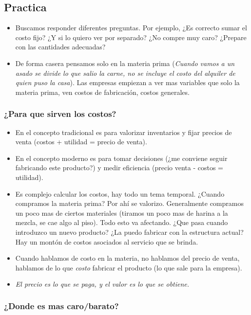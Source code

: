 \documentclass[titlepage,a4paper]{article}
\begin{document}
\subsection*{Practica}
\begin{itemize}
\item Buscamos responder diferentes preguntas. Por ejemplo, ¿Es correcto sumar el costo fijo? ¿Y si lo quiero ver por separado? ¿No compre muy caro? ¿Prepare con las cantidades adecuadas?
\item De forma casera pensamos solo en la materia prima (\textit{Cuando vamos a un asado se divide lo que salio la carne, no se incluye el costo del alquiler de quien puso la casa}). Las empresas empiezan a ver mas variables que solo la materia prima, ven costos de fabricación, costos generales.
\end{itemize}


\subsubsection*{¿Para que sirven los costos?}
\begin{itemize}
\item En el concepto tradicional es para valorizar inventarios y fijar precios de venta (costos + utilidad = precio de venta).
\item En el concepto moderno es para tomar decisiones (¿me conviene seguir fabricando este producto?) y medir eficiencia (precio venta - costos = utilidad).
\item Es complejo calcular los costos, hay todo un tema temporal. ¿Cuando compramos la materia prima? Por ahí se valorizo. Generalmente compramos un poco mas de ciertos materiales (tiramos un poco mas de harina a la mezcla, se cae algo al piso). Todo esto va afectando. ¿Que pasa cuando introduzco un nuevo producto? ¿La puedo fabricar con la estructura actual? Hay un montón de costos asociados al servicio que se brinda.
\item Cuando hablamos de costo en la materia, no hablamos del precio de venta, hablamos de lo que \textit{costo} fabricar el producto (lo que sale para la empresa). 
\item \textit{El precio es lo que se paga, y el valor es lo que se obtiene.}
\end{itemize}

\newpage
\subsubsection*{¿Donde es mas caro/barato?}
\end{document}
